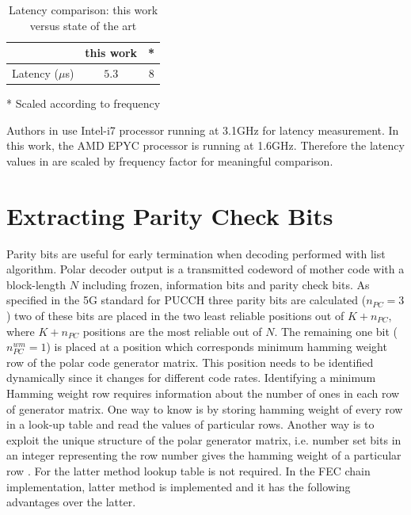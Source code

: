 \begin{table}[!h]
		\begin{center}
		\caption{Latency comparison: this work versus state of the art \cite{lowLatencySWPolarDec}}
		\label{tab:decoderLatencyStateofTheART}
		\begin{threeparttable}
		\begin{tabular}{c|c|c} %
			\textbf{ } & this work & \cite{lowLatencySWPolarDec}* \\
			\hline
			Latency ($\mu$s) & $5.3$ & $8$\\
			\hline
		\end{tabular}
	\begin{tablenotes}\footnotesize
		\item[*] Scaled according to frequency
	\end{tablenotes}
	\end{threeparttable}
	\end{center}
\end{table}

Authors in \cite{lowLatencySWPolarDec} use Intel-i7 processor running at 3.1GHz for latency measurement. In this work, the AMD EPYC processor is running at 1.6GHz. Therefore the latency values in \cite{lowLatencySWPolarDec} are scaled by frequency factor for meaningful comparison.

\section{Extracting Parity Check Bits}
Parity bits are useful for early termination when decoding performed with list algorithm. Polar decoder output is a transmitted codeword of mother code with a block-length $N$ including frozen, information bits and parity check bits. As specified in the 5G standard \cite{3gpp.38.212} for PUCCH three parity bits are calculated ($n_{PC} = 3$) two of these bits are placed in the two least reliable positions out of $K+n_{PC}$, where $K+n_{PC}$ positions are the most reliable out of $N$. The remaining one bit ($ n_{PC}^{wm} = 1 $) is placed at a position which corresponds minimum hamming weight row of the polar code generator matrix. This position needs to be identified dynamically since it changes for different code rates. Identifying a minimum Hamming weight row requires information about the number of ones in each row of generator matrix. One way to know is by storing hamming weight of every row in a look-up table and read the values of particular rows. Another way is to exploit the unique structure of the polar generator matrix, i.e. number set bits in an integer representing the row number gives the hamming weight of a particular row \cite{DesignOfPolarCodes5G}. For the latter method lookup table is not required. In the FEC chain implementation, latter method is implemented and it has the following advantages over the latter.

